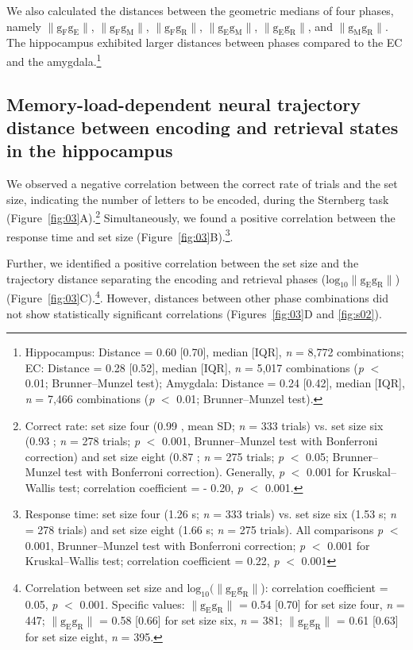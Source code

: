 We also calculated the distances between the geometric medians of four phases, namely $\mathrm{\lVert g_{F}g_{E} \rVert}$, $\mathrm{\lVert g_{F}g_{M} \rVert}$, $\mathrm{\lVert g_{F}g_{R} \rVert}$, $\mathrm{\lVert g_{E}g_{M} \rVert}$, $\mathrm{\lVert g_{E}g_{R} \rVert}$, and $\mathrm{\lVert g_{M}g_{R} \rVert}$. The hippocampus exhibited larger distances between phases compared to the EC and the amygdala.\footnote{Hippocampus: Distance = 0.60 [0.70], median [IQR], \textit{n} = 8,772 combinations; EC: Distance = 0.28 [0.52], median [IQR], \textit{n} = 5,017 combinations (\textit{p} $<$ 0.01; Brunner--Munzel test); Amygdala: Distance = 0.24 [0.42], median [IQR], \textit{n} = 7,466 combinations (\textit{p} $<$ 0.01; Brunner--Munzel test).}

\subsection{Memory-load-dependent neural trajectory distance between encoding and retrieval states in the hippocampus}
We observed a negative correlation between the correct rate of trials and the set size, indicating the number of letters to be encoded, during the Sternberg task (Figure~\ref{fig:03}A).\footnote{Correct rate: set size four (0.99 , mean \textpm SD; \textit{n} = 333 trials) vs. set size six (0.93 ; \textit{n} = 278 trials; \textit{p} $<$ 0.001, Brunner--Munzel test with Bonferroni correction) and set size eight (0.87 ; \textit{n} = 275 trials; \textit{p} $<$ 0.05; Brunner--Munzel test with Bonferroni correction). Generally, \textit{p} $<$ 0.001 for Kruskal--Wallis test; correlation coefficient = - 0.20, \textit{p} $<$ 0.001.} Simultaneously, we found a positive correlation between the response time and set size (Figure~\ref{fig:03}B).\footnote{Response time: set size four (1.26  s; \textit{n} = 333 trials) vs. set size six (1.53  s; \textit{n} = 278 trials) and set size eight (1.66  s; \textit{n} = 275 trials). All comparisons \textit{p} $<$ 0.001, Brunner--Munzel test with Bonferroni correction; \textit{p} $<$ 0.001 for Kruskal--Wallis test; correlation coefficient = 0.22, \textit{p} $<$ 0.001}.

Further, we identified a positive correlation between the set size and the trajectory distance separating the encoding and retrieval phases ($\mathrm{log_{10}\lVert g_{E}g_{R} \rVert}$) (Figure~\ref{fig:03}C).\footnote{Correlation between set size and $\mathrm{log_{10}(\lVert g_{E}g_{R} \rVert}$): correlation coefficient = 0.05, \textit{p} $<$ 0.001. Specific values: $\mathrm{\lVert g_{E}g_{R} \rVert}$ = 0.54 [0.70] for set size four, \textit{n} = 447; $\mathrm{\lVert g_{E}g_{R} \rVert}$ = 0.58 [0.66] for set size six, \textit{n} = 381; $\mathrm{\lVert g_{E}g_{R} \rVert}$ = 0.61 [0.63] for set size eight, \textit{n} = 395.}. However, distances between other phase combinations did not show statistically significant correlations (Figures~\ref{fig:03}D and \ref{fig:s02}).

